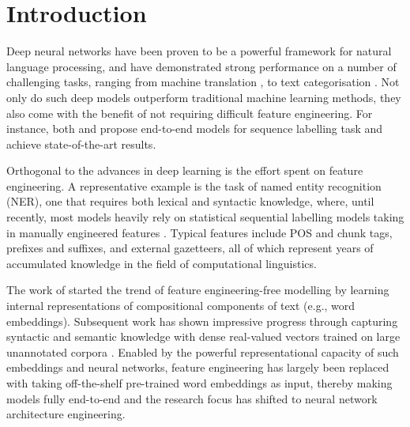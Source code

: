 \section{Introduction}
Deep neural networks have been proven to be a powerful framework for natural language processing, and have demonstrated strong performance on a number of challenging tasks, ranging from machine translation \cite{cho2014learning,cho2014properties}, to text categorisation \cite{zhang2015character, joulin2017bag, Liu+:2018b}. 
Not only do such deep models outperform traditional machine learning methods, they also come with the benefit of not requiring difficult feature engineering. 
For instance, both  and  propose end-to-end models for sequence labelling task and achieve state-of-the-art results. 

Orthogonal to the advances in deep learning is the effort spent on feature engineering. 
A representative example is the task of named entity recognition (NER), one that requires both lexical and syntactic knowledge, where, until recently, most models heavily rely on statistical sequential labelling models taking in manually engineered features \cite{florian2003named,chieu2002named,ando2005framework}. 
Typical features include POS and chunk tags, prefixes and suffixes, and external gazetteers, all of which represent years of accumulated knowledge in the field of computational linguistics.

The work of  started the trend of feature engineering-free modelling by learning internal representations of compositional components of text (e.g., word embeddings). 
Subsequent work has shown impressive progress through capturing syntactic and semantic knowledge with dense real-valued vectors trained on large unannotated corpora \cite{Mikolov+:2013a,Mikolov+:2013b,pennington2014glove}.
Enabled by the powerful representational capacity of such embeddings and neural networks, feature engineering has largely been replaced with taking off-the-shelf pre-trained word embeddings as input, thereby making models fully end-to-end and the research focus has shifted to neural network architecture engineering.

